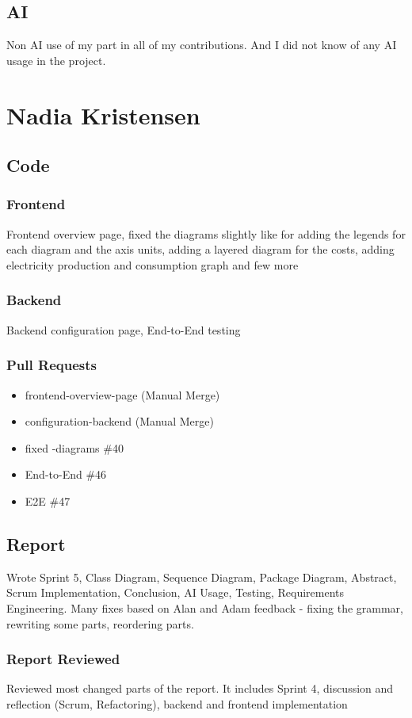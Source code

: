 \subsection*{AI}
Non AI use of my part in all of my contributions. And I did not know of any AI usage in the project.

\section*{Nadia Kristensen}
\subsection*{Code}
\subsubsection*{Frontend}
Frontend overview page, fixed the diagrams slightly like for adding the legends for each diagram and the axis units, adding a layered diagram for the costs, adding electricity production and consumption graph and few more
\subsubsection*{Backend}
Backend configuration page, End-to-End testing
\subsubsection*{Pull Requests}
\begin{itemize}
    \item frontend-overview-page (Manual Merge)
    \item configuration-backend (Manual Merge)
    \item fixed -diagrams \#40
    \item End-to-End \#46
    \item E2E \#47
\end{itemize}
\subsection*{Report}
Wrote Sprint 5, Class Diagram, Sequence Diagram, Package Diagram, Abstract, Scrum Implementation, Conclusion, AI Usage, Testing, Requirements Engineering. Many fixes based on Alan and Adam feedback - fixing the grammar, rewriting some parts, reordering parts.
\subsubsection*{Report Reviewed}
Reviewed most changed parts of the report. It includes Sprint 4, discussion and reflection (Scrum, Refactoring), backend and frontend implementation
